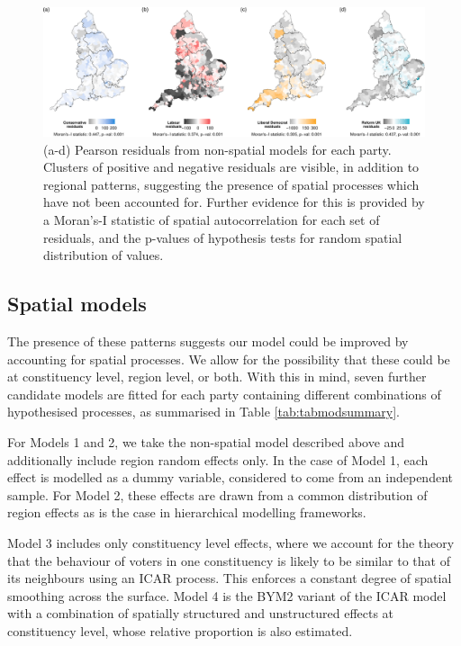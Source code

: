 \documentclass[webpdf,large,contemporary,namedate]{oup-authoring-template}
\theoremstyle{thmstyleone}
\theoremstyle{thmstyletwo}
\theoremstyle{thmstylethree}
\begin{document}
\begin{figure}[th]
\includegraphics[width=1\linewidth]{jrss_resubmission3_files/figure-latex/fignonspatial-1} \caption{(a-d) Pearson residuals from non-spatial models for each party. Clusters of positive and negative residuals are visible, in addition to regional patterns, suggesting the presence of spatial processes which have not been accounted for. Further evidence for this is provided by a Moran's-I statistic of spatial autocorrelation for each set of residuals, and the p-values of hypothesis tests for random spatial distribution of values.}\label{fig:fignonspatial}
\end{figure}

\subsection{Spatial models}\label{spatial-models}

The presence of these patterns suggests our model could be improved by
accounting for spatial processes. We allow for the possibility that
these could be at constituency level, region level, or both. With this
in mind, seven further candidate models are fitted for each party
containing different combinations of hypothesised processes, as
summarised in Table \ref{tab:tabmodsummary}.

For Models 1 and 2, we take the non-spatial model described above and
additionally include region random effects only. In the case of Model 1,
each effect is modelled as a dummy variable, considered to come from an
independent sample. For Model 2, these effects are drawn from a common
distribution of region effects as is the case in hierarchical modelling
frameworks.

Model 3 includes only constituency level effects, where we account for
the theory that the behaviour of voters in one constituency is likely to
be similar to that of its neighbours using an ICAR process. This
enforces a constant degree of spatial smoothing across the surface.
Model 4 is the BYM2 variant of the ICAR model with a combination of
spatially structured and unstructured effects at constituency level,
whose relative proportion is also estimated.
\end{document}
